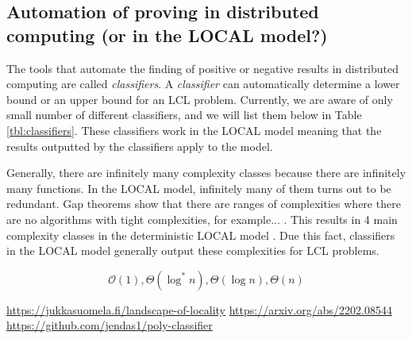 
\subsection{Automation of proving in distributed computing (or in the LOCAL model?)} \label{sec:prior_work:automation_of_proving_in_dist_comp}


The tools that automate the finding of positive or negative results in distributed computing are called \emph{classifiers}.
A \emph{classifier} can automatically determine a lower bound or an upper bound for an LCL problem.
Currently, we are aware of only small number of different classifiers, and we will list them below in Table \ref{tbl:classifiers}.
These classifiers work in the LOCAL model meaning that the results outputted by the classifiers apply to the model.

Generally, there are infinitely many complexity classes because there are infinitely many functions.
In the LOCAL model, infinitely many of them turns out to be redundant.
Gap theorems show that there are ranges of complexities where there are no algorithms with tight complexities, for example... \cite{}.
This results in 4 main complexity classes in the deterministic LOCAL model \cite{}.
Due this fact, classifiers in the LOCAL model generally output these complexities for LCL problems.

\[\mathcal{O}(1), \Theta(\log^* n), \Theta(\log n), \Theta(n)\]
\todo{}

 \url{https://jukkasuomela.fi/landscape-of-locality}
\url{https://arxiv.org/abs/2202.08544}
\url{https://github.com/jendas1/poly-classifier}


